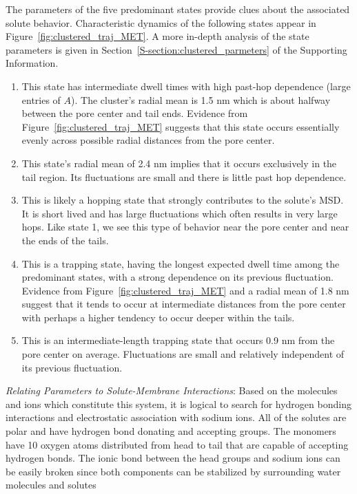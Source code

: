 \documentclass[journal=jpcbfk,manuscript=article]{achemso}
\begin{document}
  The parameters of the five predominant states provide clues about the associated solute
  behavior. Characteristic dynamics of the following states appear in 
  Figure~\ref{fig:clustered_traj_MET}. A more in-depth analysis of the state parameters
  is given in Section~\ref{S-section:clustered_parmeters} of the Supporting Information.
  \begin{enumerate}[label={State \theenumi :}, leftmargin=3.5\parindent]
  
     \item This state has intermediate dwell times with high past-hop dependence (large
     entries of $A$). The cluster's radial mean is 1.5 nm which is about halfway between
     the pore center and tail ends. Evidence from Figure~\ref{fig:clustered_traj_MET} 
     suggests that this state occurs essentially evenly across possible radial
     distances from the pore center.
     
     \item This state's radial mean of 2.4 nm implies that it occurs exclusively in the
     tail region. Its fluctuations are small and there is little past hop dependence.
     
     \item This is likely a hopping state that strongly contributes to the solute's MSD. 
     It is short lived and has large fluctuations which often results in very large hops.
     Like state 1, we see this type of behavior near the pore center and near the ends of the tails.
     
     \item This is a trapping state, having the longest expected dwell time among the predominant
     states, with a strong dependence on its previous fluctuation. Evidence from 
     Figure~\ref{fig:clustered_traj_MET} and a radial mean of 1.8 nm suggest that 
     it tends to occur at intermediate distances from the pore center with perhaps
     a higher tendency to occur deeper within the tails.
     
     \item This is an intermediate-length trapping state that occurs 0.9 nm from the pore 
     center on average. Fluctuations are small and relatively independent of its previous 
     fluctuation.
     
  \end{enumerate}
   
  \textit{Relating Parameters to Solute-Membrane Interactions}: Based on the
  molecules and ions which constitute this system, it is logical to search for hydrogen 
  bonding interactions and electrostatic association with sodium ions. All of 
  the solutes are polar and have hydrogen bond donating and accepting groups. The monomers 
  have 10 oxygen atoms distributed from head to tail that are capable of 
  accepting hydrogen bonds. The ionic bond between the head groups and sodium ions 
  can be easily broken since both components can be stabilized by surrounding 
  water molecules and solutes 
\end{document}
